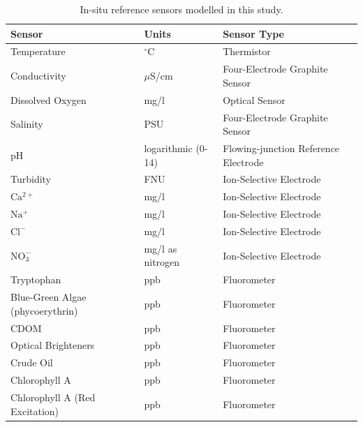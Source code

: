 \documentclass[journal,article,submit,pdftex,moreauthors]{Definitions/mdpi}
\begin{document}
\begin{table}[H] 
\caption{In-situ reference sensors modelled in this study.\label{tab:sensors}}
\begin{tabularx}{\textwidth}{CCC}
\toprule
\textbf{Sensor}	& \textbf{Units}	& \textbf{Sensor Type}\\
\midrule
Temperature		                    & $^{\circ}$C       & Thermistor \\
Conductivity                        & $\mu$S/cm         & Four-Electrode Graphite Sensor \\
Dissolved Oxygen                    & mg/l              & Optical Sensor\\
Salinity                            & PSU               & Four-Electrode Graphite Sensor \\
pH                                  & logarithmic (0-14)& Flowing-junction Reference Electrode\\
Turbidity                           & FNU               & Ion-Selective Electrode \\
$\mathrm{Ca^{2+}}$                  & mg/l              & Ion-Selective Electrode \\
$\mathrm{Na^+}$                     & mg/l              & Ion-Selective Electrode \\
$\mathrm{Cl^-}$                     & mg/l              & Ion-Selective Electrode \\
$\mathrm{NO_3^-}$                   & mg/l as nitrogen  & Ion-Selective Electrode \\
Tryptophan                          & ppb               & Fluorometer \\
Blue-Green Algae (phycoerythrin)    & ppb               & Fluorometer \\
CDOM                                & ppb               & Fluorometer \\
Optical Brighteners                 & ppb               & Fluorometer \\
Crude Oil                           & ppb               & Fluorometer \\
Chlorophyll A                       & ppb               & Fluorometer \\
Chlorophyll A (Red Excitation)      & ppb               & Fluorometer \\
\bottomrule
\end{tabularx}
\end{table}
\end{document}
